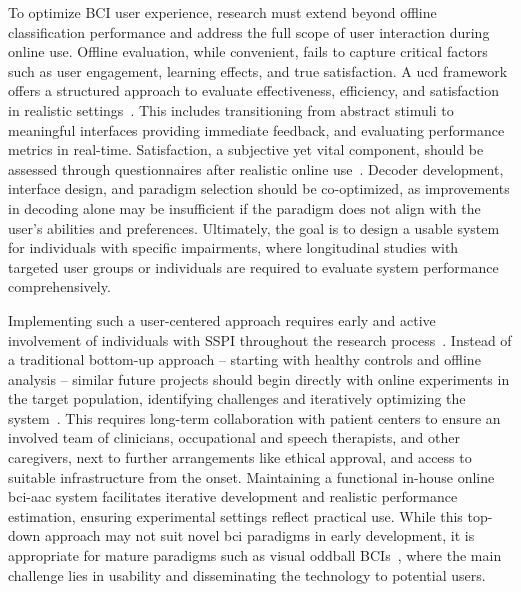 \documentclass{article}
\begin{document}
To optimize BCI user experience, research must extend beyond offline classification
performance and address the full scope of user interaction during online use.
Offline evaluation, while convenient, fails to capture critical factors such as
user engagement, learning effects, and true satisfaction.
A \ac{ucd} framework offers a structured approach to evaluate
effectiveness, efficiency, and satisfaction in realistic
settings~\cite{Standardization2009,Schreuder2013,Kuebler2014,Han2022}.
This includes transitioning from abstract stimuli to meaningful interfaces
providing immediate feedback, and evaluating performance metrics in real-time.
Satisfaction, a subjective yet vital component, should be assessed through
questionnaires after realistic online use~\cite{Kuebler2014}.
Decoder development, interface design, and paradigm selection should be
co-optimized, as improvements in decoding alone may be insufficient if the
paradigm does not align with the user’s abilities and preferences.
Ultimately, the goal is to design a usable system for individuals with
specific impairments, where longitudinal studies with targeted user groups or
individuals are required to evaluate system performance comprehensively.

Implementing such a user-centered approach requires early and active involvement
of individuals with SSPI throughout the research process~\cite{Standardization2009}.
Instead of a traditional bottom-up approach -- starting with healthy controls and
offline analysis -- similar future projects should begin directly with online experiments
in the target population, identifying challenges and iteratively optimizing the
system~\cite{FriedOken2020}.
This requires long-term collaboration with patient centers to ensure an involved
team of clinicians, occupational and speech therapists, and other caregivers, next to
further arrangements like ethical approval, and access to suitable infrastructure
from the onset.
Maintaining a functional in-house online \ac{bci}-\ac{aac} system facilitates iterative
development and realistic performance estimation, ensuring experimental settings
reflect practical use.
While this top-down approach may not suit novel \ac{bci} paradigms in early
development, it is appropriate for mature paradigms such as visual oddball
BCIs~\cite{Pan2022,Fouad2020}, where the main challenge lies in usability and
disseminating the technology to potential users.

\acresetall
\end{document}
